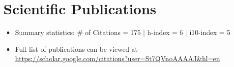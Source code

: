 \documentclass[11pt,a4paper,sans]{moderncv}        %
\begin{document}
\section{Scientific Publications}

\vspace{6pt}
 
\begin{itemize}

\item{Summary statistics: \# of Citations = 175 |  h-index = 6 | i10-index = 5}
\vspace{6pt}
\item{Full list of publications can be viewed at \href{https://scholar.google.com/citations?user=St7QVnoAAAAJ\&hl=en}{https://scholar.google.com/citations?user=St7QVnoAAAAJ\&hl=en}}


\end{itemize}



\nocite{*}



\end{document}
